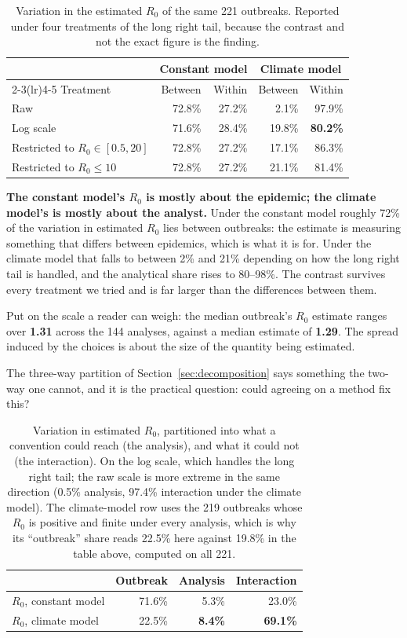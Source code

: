 \documentclass[11pt,a4paper]{article}
\begin{document}
\begin{table}[htbp]
\centering
\caption{Variation in the estimated $R_0$ of the same 221 outbreaks. Reported
under four treatments of the long right tail, because the contrast and not the
exact figure is the finding.}
\begin{tabular}{lrrrr}
\toprule
& \multicolumn{2}{c}{Constant model} & \multicolumn{2}{c}{Climate model} \\
\cmidrule(lr){2-3}\cmidrule(lr){4-5}
Treatment & Between & Within & Between & Within \\
\midrule
Raw & 72.8\% & 27.2\% & 2.1\% & 97.9\% \\
Log scale & 71.6\% & 28.4\% & 19.8\% & \textbf{80.2\%} \\
Restricted to $R_0 \in [0.5, 20]$ & 72.8\% & 27.2\% & 17.1\% & 86.3\% \\
Restricted to $R_0 \le 10$ & 72.8\% & 27.2\% & 21.1\% & 81.4\% \\
\bottomrule
\end{tabular}
\end{table}

\textbf{The constant model's $R_0$ is mostly about the epidemic; the climate
model's is mostly about the analyst.} Under the constant model roughly 72\% of the
variation in estimated $R_0$ lies between outbreaks: the estimate is measuring
something that differs between epidemics, which is what it is for. Under the
climate model that falls to between 2\% and 21\% depending on how the long right
tail is handled, and the analytical share rises to 80--98\%. The contrast survives
every treatment we tried and is far larger than the differences between them.

Put on the scale a reader can weigh: the median outbreak's $R_0$ estimate ranges
over \textbf{1.31} across the 144 analyses, against a median estimate of
\textbf{1.29}. The spread induced by the choices is about the size of the quantity
being estimated.

The three-way partition of Section~\ref{sec:decomposition} says something the
two-way one cannot, and it is the practical question: could agreeing on a method
fix this?

\begin{table}[htbp]
\centering
\caption{Variation in estimated $R_0$, partitioned into what a convention could
reach (the analysis), and what it could not (the interaction). On the log scale,
which handles the long right tail; the raw scale is more extreme in the same
direction (0.5\% analysis, 97.4\% interaction under the climate model). The
climate-model row uses the 219 outbreaks whose $R_0$ is positive and finite under
every analysis, which is why its ``outbreak'' share reads 22.5\% here against
19.8\% in the table above, computed on all 221.}
\begin{tabular}{lrrr}
\toprule
& Outbreak & Analysis & Interaction \\
\midrule
$R_0$, constant model & 71.6\% & 5.3\% & 23.0\% \\
$R_0$, climate model & 22.5\% & \textbf{8.4\%} & \textbf{69.1\%} \\
\bottomrule
\end{tabular}
\end{table}
\end{document}
